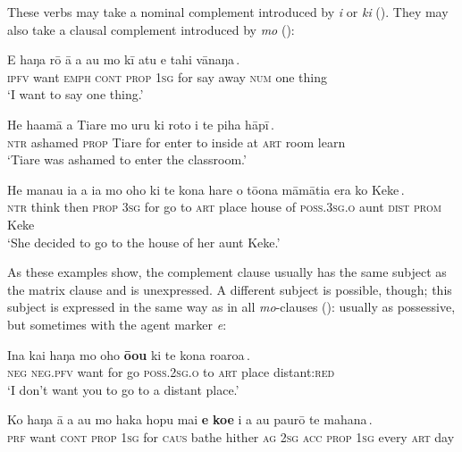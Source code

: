 These verbs may take a nominal complement introduced by \textit{i} or \textit{ki} (). They may also take a clausal complement introduced by \textit{mo} ():

\ea\label{ex:11.70}
\gll E haŋa rō {\ꞌ}ā a au {\ob}mo kī atu e tahi vānaŋa\,{\cb}. \\
\textsc{ipfv} want \textsc{emph} \textsc{cont} \textsc{prop} \textsc{1sg} {\db}for say away \textsc{num} one thing \\

\glt 
‘I want to say one thing.’ \textstyleExampleref{[R447.025]} 
\z

\ea\label{ex:11.71}
\gll He ha{\ꞌ}amā a Tiare {\ob}mo uru ki roto i te piha hāpī\,{\cb}. \\
\textsc{ntr} ashamed \textsc{prop} Tiare {\db}for enter to inside at \textsc{art} room learn \\

\glt 
‘Tiare was ashamed to enter the classroom.’ \textstyleExampleref{[R334.032]} 
\z

\ea\label{ex:11.72}
\gll He mana{\ꞌ}u ia a ia {\ob}mo oho ki te kona hare o tō{\ꞌ}ona  māmātia era ko Keke\,{\cb}.\\
\textsc{ntr} think then \textsc{prop} \textsc{3sg} {\db}for go to \textsc{art} place house of \textsc{poss.3sg.o}  aunt \textsc{dist} \textsc{prom} Keke\\

\glt
‘She decided to go to the house of her aunt Keke.’ \textstyleExampleref{[R345.090]} 
\z

As these examples show, the complement clause usually has the same subject as the matrix clause and is unexpressed. A different subject is possible, though; this subject is expressed in the same way as in all \textit{mo}-clauses (): usually as possessive, but sometimes with the agent marker \textit{e}:

\ea\label{ex:11.73}
\gll {\ꞌ}Ina kai haŋa {\ob}mo oho \textbf{ō{\ꞌ}ou} ki te kona roaroa\,{\cb}. \\
\textsc{neg} \textsc{neg.pfv} want {\db}for go \textsc{poss.2sg.o} to \textsc{art} place distant:\textsc{red} \\

\glt 
‘I don’t want you to go to a distant place.’ \textstyleExampleref{[R210.018]} 
\z

\ea\label{ex:11.74}
\gll Ko haŋa {\ꞌ}ā a au {\ob}mo haka hopu mai \textbf{e} \textbf{koe} i a au  paurō te mahana\,{\cb}.\\
\textsc{prf} want \textsc{cont} \textsc{prop} \textsc{1sg} {\db}for \textsc{caus} bathe hither \textsc{ag} \textsc{2sg} \textsc{acc} \textsc{prop} \textsc{1sg}  every \textsc{art} day\\

